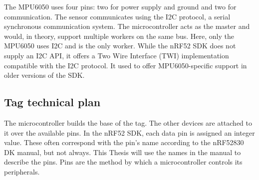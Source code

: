 The MPU6050 uses four pins: two for power supply and ground and two for communication.
The sensor communicates using the I2C protocol, a serial synchronous communication system.
The microcontroller acts as the master and would, in theory, support multiple workers on the same bus. 
Here, only the MPU6050 uses I2C and is the only worker.
While the nRF52 SDK does not supply an I2C API, it offers a Two Wire Interface (TWI) implementation compatible with the I2C protocol.
It used to offer MPU6050-specific support in older versions of the SDK. 

\subsection{Tag technical plan}
The microcontroller builds the base of the tag. 
The other devices are attached to it over the available pins.
In the nRF52 SDK, each data pin is assigned an integer value. 
These often correspond with the pin's name according to the nRF52830 DK manual, but not always.
This Thesis will use the names in the manual to describe the pins.
Pins are the method by which a microcontroller controls its peripherals.


